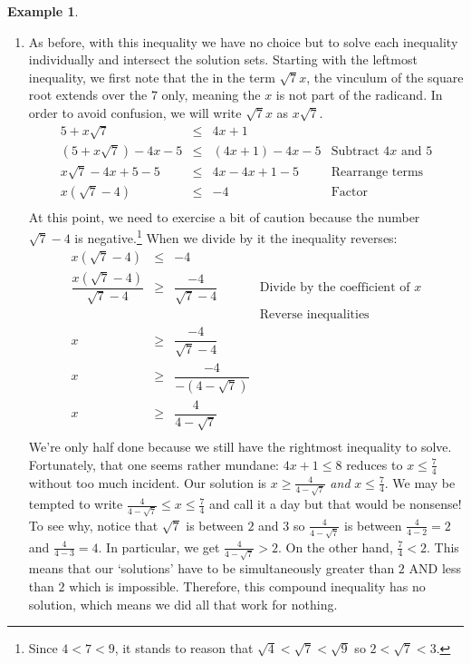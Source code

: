 \documentclass[11pt]{article}
\theoremstyle{definition}  %
\newtheorem{ex}{\bf Example}[section]
\begin{document}
\begin{ex}
\begin{enumerate}
\item As before, with this inequality  we have no choice but to solve each inequality individually and intersect the solution sets.  Starting with the leftmost inequality, we first note that the in the term $\sqrt{7} x$, the vinculum of the square root extends over the $7$ only, meaning the $x$ is not part of the radicand.  In order to avoid confusion, we will write $\sqrt{7} x$ as $x \sqrt{7}$.\[ \begin{array}{rclr}

5 + x\sqrt{7}  & \leq & 4x+1  & \\

(5 + x\sqrt{7} ) -4x  - 5 & \leq&  (4x + 1) - 4x - 5  & \text{Subtract $4x$ and $5$} \\

x\sqrt{7} - 4x + 5 - 5 & \leq & 4x - 4x + 1 - 5 & \text{Rearrange terms} \\

x(\sqrt{7} - 4) & \leq & -4 & \text{Factor} \\ \end{array} \] At this point, we need to exercise a bit of caution because the number $\sqrt{7} - 4$ is negative.\footnote{Since $4 < 7 < 9$, it stands to reason that $\sqrt{4} < \sqrt{7} < \sqrt{9}$ so $2 < \sqrt{7} < 3$.} When we divide by it the inequality reverses:\[ \begin{array}{rclr}

x(\sqrt{7} - 4) & \leq & -4 & \\[3pt]

\dfrac{x(\sqrt{7}-4)}{\sqrt{7}-4} & \geq & \dfrac{-4}{\sqrt{7} - 4} & \text{Divide by the coefficient of $x$} \\ [-8pt]
                                  &      &                          & \text{Reverse inequalities} \\ [-3pt]

x & \geq & \dfrac{-4}{\sqrt{7} - 4} & \\ [10pt]

x & \geq & \dfrac{-4}{-(4 - \sqrt{7})} &  \\ [12pt]

x & \geq & \dfrac{4}{4 -\sqrt{7}} & \\

\end{array} \] We're only half done because we still have the rightmost inequality to solve.  Fortunately, that one seems rather mundane:  $4x+1 \leq 8$ reduces to $x \leq \frac{7}{4}$ without too much incident.  Our solution is $ x \geq \frac{4}{4-\sqrt{7}}$ \textit{and} $x \leq \frac{7}{4}$.  We may be tempted to write $\frac{4}{4-\sqrt{7}} \leq x \leq \frac{7}{4}$ and call it a day but that would be nonsense!  To see why, notice that $\sqrt{7}$ is between $2$ and $3$ so $\frac{4}{4 - \sqrt{7}}$ is between  $\frac{4}{4-2} = 2$ and $\frac{4}{4-3} = 4$. In particular, we get $\frac{4}{4 - \sqrt{7}} > 2$.  On the other hand, $\frac{7}{4} < 2$.  This means that our `solutions' have to be simultaneously  greater than $2$ AND less than $2$  which is impossible.  Therefore, this compound inequality has no solution, which means we did all that work for nothing.


\end{enumerate}
\end{ex}
\end{document}

